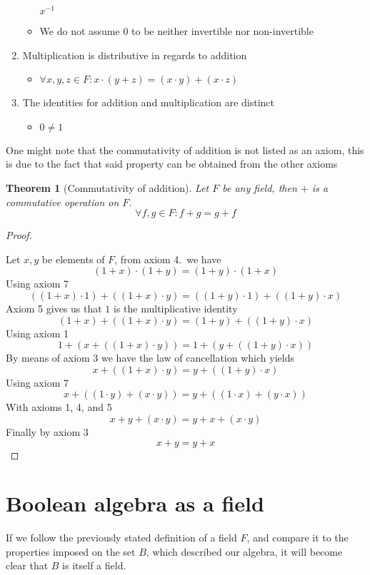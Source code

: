 \documentclass{article}
\newtheorem*{theorem}{Theorem}
\begin{document}
\begin{enumerate}
\begin{itemize}
	      	      $x^{-1}$
	      	\item We do not assume $0$ to be neither invertible nor non-invertible
	      \end{itemize}
	\item Multiplication is distributive in regards to addition
	      \begin{itemize}
	      	\item $\forall x,y,z \in F : x \cdot (y + z) = (x \cdot y) + (x \cdot z)$
	      \end{itemize}
	\item The identities for addition and multiplication are distinct
	      \begin{itemize}
	      	\item $0 \neq 1$
	      \end{itemize}
\end{enumerate}

One might note that the commutativity of addition is not listed as an axiom,
this is due to the fact that said property can be obtained from the other axioms

\begin{theorem}[Commutativity of addition]

	Let $F$ be any field, then $+$ is a commutative operation on $F$.
	$$\forall f,g \in F :  f + g = g + f$$
\end{theorem}
\begin{proof}\cite{addcomm}

	Let $x, y$ be elements of $F$, from axiom 4.\ we have
	$$(1+x)\cdot(1+y)=(1+y)\cdot(1+x)$$
	Using axiom 7
	$$((1+x)\cdot 1)+((1+x)\cdot y) = ((1+y)\cdot 1)+((1+y)\cdot x)$$
	Axiom 5 gives us that $1$ is the multiplicative identity
	$$(1+x)+((1+x)\cdot y) = (1+y)+((1+y)\cdot x)$$
	Using axiom 1
	$$1+(x+((1+x)\cdot y)) = 1+(y+((1+y)\cdot x))$$
	By means of axiom 3 we have the law of cancellation which yields
	$$x+((1+x)\cdot y) = y+((1+y)\cdot x)$$
	Using axiom 7
	$$x+((1\cdot y)+(x\cdot y)) = y+((1\cdot x)+(y\cdot x))$$
	With axioms 1, 4, and 5
	$$x+y+(x\cdot y) = y+x+(x\cdot y)$$
	Finally by axiom 3
	$$x+y=y+x$$
\end{proof}
\section{Boolean algebra as a field}
\label{sec:Boolean algebra as a field}

If we follow the previously stated definition of a field $F$, and compare it to
the properties imposed on the set $B$, which described our algebra, it will
become clear that $B$ is itself a field.
\end{document}

